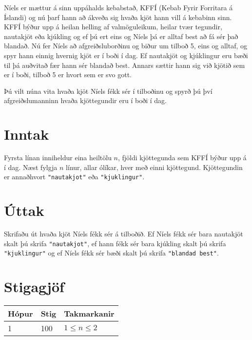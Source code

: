 
Níels er mættur á sinn uppáhalds kebabstað, KFFÍ (Kebab Fyrir Forritara á Íslandi) og nú þarf hann að ákveða sig hvaða kjöt hann vill á kebabinn sinn.
KFFÍ býður upp á heilan helling af valmöguleikum, heilar tvær tegundir, nautakjöt eða kjúkling og ef þú ert eins og Níels þá er alltaf best að fá sér það blandað.
Nú fer Níels að afgreiðsluborðinu og biður um tilboð 5, eins og alltaf, og spyr hann einnig hvernig kjöt er í boði í dag. 
Ef nautakjöt og kjúklingur eru bæði til þá auðvitað fær hann sér blandað best. Annars sættir hann sig við kjötið sem er í boði, tilboð 5 er hvort sem er svo gott.

Þú vilt núna vita hvaða kjöt Níels fékk sér í tilboðinu og spyrð þú því afgreiðslumanninn hvaða kjöttegundir eru í boði í dag.

\section*{Inntak}
Fyrsta línan inniheldur eina heiltölu $n$, fjöldi kjöttegunda sem KFFÍ býður upp á í dag.
Næst fylgja $n$ línur, allar ólíkar, hver með einni kjöttegund. Kjöttegundin er annaðhvort \texttt{"nautakjot"} eða \texttt{"kjuklingur"}.

\section*{Úttak}
Skrifaðu út hvaða kjöt Níels fékk sér á tilboðið. Ef Níels fékk sér bara nautakjöt skalt þú skrifa
\texttt{"nautakjot"}, ef hann fékk sér bara kjúkling skalt þú skrifa \texttt{"kjuklingur"} og ef Níels fékk sér bæði
skalt þú skrifa \texttt{"blandad best"}.

\section*{Stigagjöf}
\begin{tabular}{|l|l|l|}
\hline
Hópur & Stig & Takmarkanir \\ \hline
1     & 100   & $1 \leq n \leq 2$ \\ \hline
\end{tabular}

